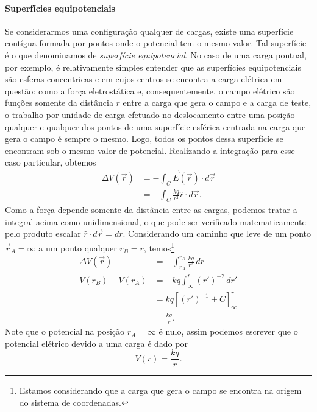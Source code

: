 \paragraph{Superfícies equipotenciais}

Se considerarmos uma configuração qualquer de cargas, existe uma superfície contígua formada por pontos onde o potencial tem o mesmo valor. Tal superfície é o que denominamos de \emph{superfície equipotencial}. No caso de uma carga pontual, por exemplo, é relativamente simples entender que as superfícies equipotenciais são esferas concentricas e em cujos centros se encontra a carga elétrica em questão: como a força eletrostática e, consequentemente, o campo elétrico são funções somente da distância $r$ entre a carga que gera o campo e a carga de teste, o trabalho por unidade de carga efetuado no deslocamento entre uma posição qualquer e qualquer dos pontos de uma superfície esférica centrada na carga que gera o campo é sempre o mesmo. Logo, todos os pontos dessa superfície se encontram sob o mesmo valor de potencial. Realizando a integração para esse caso particular, obtemos
\begin{align}
    \Delta V(\vec{r}) &= - \int_C \vec{E}(\vec{r}) \cdot d\vec{r} \\
    &= - \int_C \frac{kq}{r^2} \hat{r} \cdot d\vec{r}.
\end{align}
%
Como a força depende somente da distância entre as cargas, podemos tratar a integral acima como unidimensional, o que pode ser verificado matematicamente pelo produto escalar $\hat{r}\cdot d\vec{r} = dr$. Considerando um caminho que leve de um ponto $\vec{r}_A = \infty$ a um ponto qualquer $r_B = r$, temos\footnote{Estamos considerando que a carga que gera o campo se encontra na origem do sistema de coordenadas.} 
\begin{align}
    \Delta V(\vec{r}) &= - \int_{r_A}^{r_B} \frac{kq}{r^2} \,dr \\
    V(r_B) - V(r_A) &= - kq \int_{\infty}^{r} (r')^{-2} \,dr' \\
    &= kq [(r')^{-1} + C]_{\infty}^{r} \\
    &= \frac{kq}{r}.
\end{align}
%
Note que o potencial na posição $r_A = \infty$ é nulo, assim podemos escrever que o potencial elétrico devido a uma carga é dado por
\begin{equation}
    V(r) = \frac{kq}{r}.
\end{equation}

